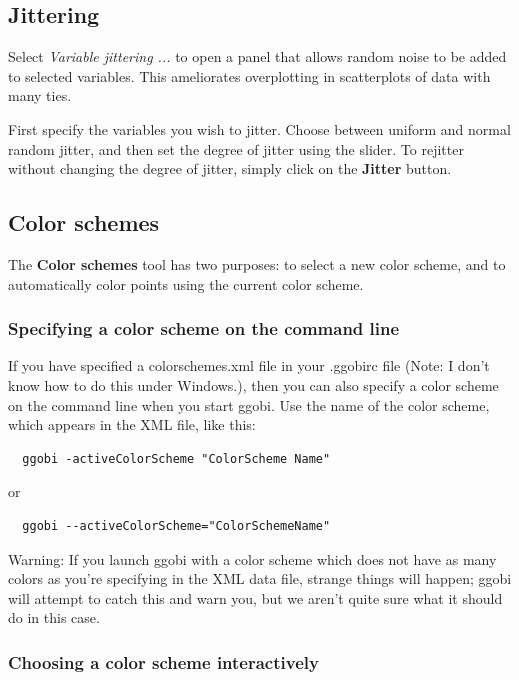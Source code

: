 \documentclass[11pt]{article}
\begin{document}
\subsection{Jittering}

Select {\em Variable jittering ...} to open a panel that allows
random noise to be added to selected variables.  This ameliorates
overplotting in scatterplots of data with many ties.

First specify the variables you wish to jitter.  Choose between uniform
and normal random jitter, and then set the degree of jitter using the
slider.  To rejitter without changing the degree of jitter, simply click
on the {\bf Jitter} button.

\subsection{Color schemes}
\label{slbl:ColorSchemes}

The {\bf Color schemes} tool has two purposes: to select a
new color scheme, and to automatically color points
using the current color scheme.

\subsubsection{Specifying a color scheme on the command line}

If you have specified a colorschemes.xml file in your .ggobirc file
(Note: I don't know how to do this under Windows.),
then you can also specify a color scheme on the command line when you
start ggobi.  Use the name of the color scheme, which appears in the
XML file, like this:

\begin{verbatim}
  ggobi -activeColorScheme "ColorScheme Name"
\end{verbatim}
  or   
\begin{verbatim}
  ggobi --activeColorScheme="ColorSchemeName"
\end{verbatim}

Warning: If you launch ggobi with a color scheme which does not have
as many colors as you're specifying in the XML data file, strange
things will happen; ggobi will attempt to catch this and warn you,
but we aren't quite sure what it should do in this case.

\subsubsection{Choosing a color scheme interactively}
\end{document}
